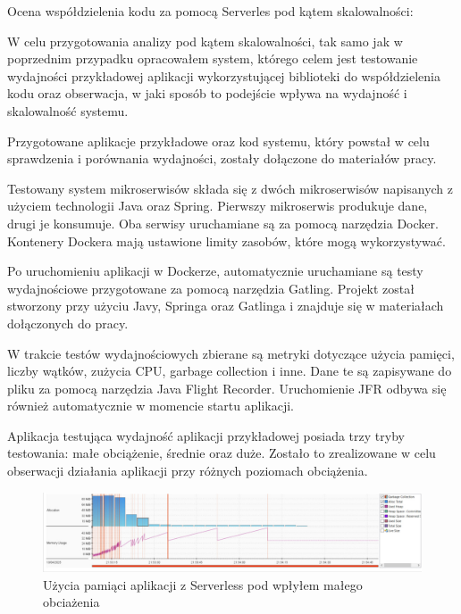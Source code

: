 \documentclass[runningheads,12pt]{llncs}
\begin{document}
\newpage


Ocena współdzielenia kodu za pomocą Serverles pod kątem skalowalności:

W celu przygotowania analizy pod kątem skalowalności, tak samo jak w poprzednim przypadku opracowałem system, którego celem jest testowanie wydajności przykładowej aplikacji wykorzystującej biblioteki do współdzielenia kodu oraz obserwacja, w jaki sposób to podejście wpływa na wydajność i skalowalność systemu.

Przygotowane aplikacje przykładowe oraz kod systemu, który powstał w celu sprawdzenia i porównania wydajności, zostały dołączone do materiałów pracy.

Testowany system mikroserwisów składa się z dwóch mikroserwisów napisanych z użyciem technologii Java oraz Spring. Pierwszy mikroserwis produkuje dane, drugi je konsumuje. Oba serwisy uruchamiane są za pomocą narzędzia Docker. Kontenery Dockera mają ustawione limity zasobów, które mogą wykorzystywać.

Po uruchomieniu aplikacji w Dockerze, automatycznie uruchamiane są testy wydajnościowe przygotowane za pomocą narzędzia Gatling. Projekt został stworzony przy użyciu Javy, Springa oraz Gatlinga i znajduje się w materiałach dołączonych do pracy.

W trakcie testów wydajnościowych zbierane są metryki dotyczące użycia pamięci, liczby wątków, zużycia CPU, garbage collection i inne. Dane te są zapisywane do pliku za pomocą narzędzia Java Flight Recorder. Uruchomienie JFR odbywa się również automatycznie w momencie startu aplikacji.

Aplikacja testująca wydajność aplikacji przykładowej posiada trzy tryby testowania: małe obciążenie, średnie oraz duże. Zostało to zrealizowane w celu obserwacji działania aplikacji przy różnych poziomach obciążenia.

\begin{figure}
    \includegraphics[width=\linewidth]{images/serverless-memory-low-graph.jpg}
    \caption{Użycia pamiąci aplikacji z Serverless pod wpłyłem małego obciażenia} \label{fig1}
\end{figure}
\end{document}
